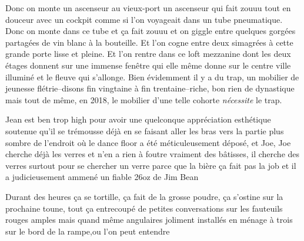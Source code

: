 Donc on monte un ascenseur au vieux-port un
ascenseur qui fait zouuu tout en douceur avec un cockpit comme si l'on
voyageait dans un tube pneumatique.  Donc on monte dans ce tube et ça fait
zouuu et on giggle entre quelques gorgées partagées de vin blanc à la
bouteille. Et l'on cogne entre deux simagrées à cette grande porte lisse et
pleine. Et l'on rentre dans ce loft mezzanine dont les deux étages
donnent sur une immense fenêtre qui elle même donne sur le centre ville
illuminé et le fleuve qui s'allonge.  Bien évidemment il y a du trap, un
mobilier de jeunesse flétrie--disons fin vingtaine à fin trentaine--riche, bon
rien de dynastique mais tout de même, en 2018, le mobilier d'une telle cohorte
\emph{nécessite} le trap.
%
\begin{comment}\footnote{Le trap est un style musical qui a ses origines dans le hip-hop du
    sud des états-unis. Il est marqué par de très rapides coups de snare en
    triplettes sur de larges basses lines qui ondulent sous le rythme de gros
    gras kick-drum.  Le tout est garnit alors de \textit{mumble rap}, un style
    de rap où l'artiste déploie paresseusement ses rhymes, lorsqu'il y en a,
    avec l'accent d'un ivrogne sur la codéine, le rythme encore en triplettes:
    tatata-tatata-tatata-TA.  Nous pourrions qualifier ce dernier style d'une
série de dactyles punchés à la fin par un anapeste moderne} Le condo est situé
au dernier étage d'un nouvel immeuble au vieux port de Montréal, les planchers
de granit peut-être.
\end{comment}
Jean est ben trop high pour avoir une
quelconque appréciation esthétique soutenue qu'il se trémousse déjà en se
faisant aller les bras vers la partie plus sombre de l'endroit où le dance
floor a été méticuleusement déposé, et Joe, Joe cherche déjà les verres et n'en
a rien à foutre vraiment des bâtisses, il cherche des verres surtout pour se
chercher un verre parce que la bière ça fait pas la job et il a judicieusement
ammené un fiable 26oz de Jim Bean
\begin{comment}Le Jim Bean est un whiskey, un
    bourbon pour être plus précis, connu comme étant typiffiant de l'amérique
    avec un gros r sale, d'une toxicité masculine, avec sa bouteille nettement
carrée et son petit coup de coude en fin de gorgée, il est pas mal quand même.
Et pour le prix, pour le prix\ldots
\end{comment}
Durant des heures ça se tortille, ça fait
de la grosse poudre, ça s'ostine sur la prochaine toune, tout ça entrecoupé de
petites conversations sur les fauteuils rouges amples mais quand même
angulaires joliment installés en ménage à trois sur le bord de la rampe,ou l'on
peut entendre \\

